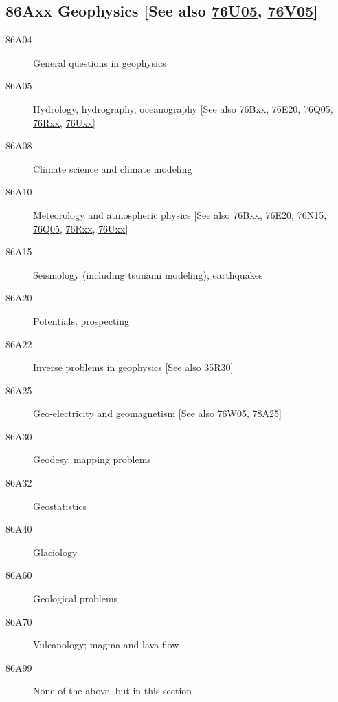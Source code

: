 \documentclass[letterpaper]{article}
\begin{document}
\subsection*{86Axx  Geophysics [See also \hyperref[76U05]{76U05}, \hyperref[76V05]{76V05}] }\label{86Axx}
\begin{description}  
\item [86A04]\label{86A04} General questions in geophysics
\item [86A05]\label{86A05} Hydrology, hydrography, oceanography [See also \hyperref[76Bxx]{76Bxx}, \hyperref[76E20]{76E20}, \hyperref[76Q05]{76Q05}, \hyperref[76Rxx]{76Rxx}, \hyperref[76Uxx]{76Uxx}]
\item [86A08]\label{86A08} Climate science and climate modeling
\item [86A10]\label{86A10} Meteorology and atmospheric physics [See also \hyperref[76Bxx]{76Bxx}, \hyperref[76E20]{76E20}, \hyperref[76N15]{76N15}, \hyperref[76Q05]{76Q05}, \hyperref[76Rxx]{76Rxx}, \hyperref[76Uxx]{76Uxx}]
\item [86A15]\label{86A15} Seismology (including tsunami modeling), earthquakes
\item [86A20]\label{86A20} Potentials, prospecting
\item [86A22]\label{86A22} Inverse problems in geophysics [See also \hyperref[35R30]{35R30}]
\item [86A25]\label{86A25} Geo-electricity and geomagnetism [See also \hyperref[76W05]{76W05}, \hyperref[78A25]{78A25}]
\item [86A30]\label{86A30} Geodesy, mapping problems
\item [86A32]\label{86A32} Geostatistics
\item [86A40]\label{86A40} Glaciology
\item [86A60]\label{86A60} Geological problems
\item [86A70]\label{86A70} Vulcanology; magma and lava flow
\item [86A99]\label{86A99} None of the above, but in this section
\end{description}
\end{document}
